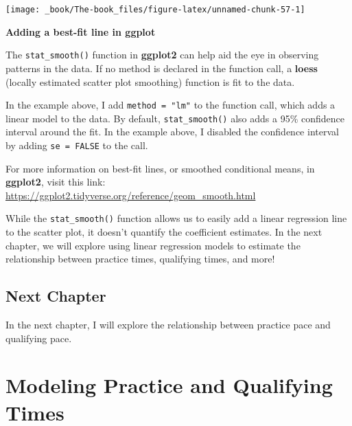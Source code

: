 \documentclass[
]{book}
\begin{document}
\begin{center}\texttt{[image: \_book/The-book\_files/figure-latex/unnamed-chunk-57-1]} \end{center}

\begin{blackbox}

\begin{center}
\textbf{Adding a best-fit line in ggplot}

\end{center}

The \texttt{stat\_smooth()} function in \textbf{ggplot2} can help aid the eye in observing patterns in the data. If no method is declared in the function call, a \textbf{loess} (locally estimated scatter plot smoothing) function is fit to the data.

In the example above, I add \texttt{method\ =\ "lm"} to the function call, which adds a linear model to the data. By default, \texttt{stat\_smooth()} also adds a 95\% confidence interval around the fit. In the example above, I disabled the confidence interval by adding \texttt{se\ =\ FALSE} to the call.

For more information on best-fit lines, or smoothed conditional means, in \textbf{ggplot2}, visit this link: \url{https://ggplot2.tidyverse.org/reference/geom_smooth.html}

\end{blackbox}

While the \texttt{stat\_smooth()} function allows us to easily add a linear regression line to the scatter plot, it doesn't quantify the coefficient estimates. In the next chapter, we will explore using linear regression models to estimate the relationship between practice times, qualifying times, and more!

\hypertarget{next-chapter-1}{%
\section{Next Chapter}\label{next-chapter-1}}

In the next chapter, I will explore the relationship between practice pace and qualifying pace.

\hypertarget{modeling-practice-and-qualifying-times}{%
\chapter{Modeling Practice and Qualifying Times}\label{modeling-practice-and-qualifying-times}}
\end{document}
